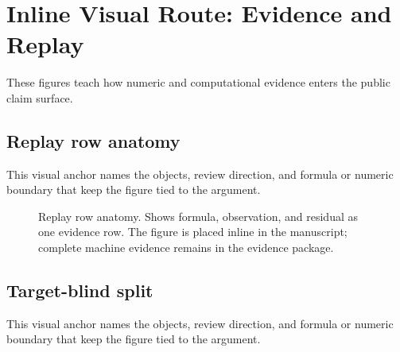 \section{Inline Visual Route: Evidence and Replay}

These figures teach how numeric and computational evidence enters the public claim surface.


\subsection{Replay row anatomy}

This visual anchor names the objects, review direction, and formula or numeric boundary that keep the figure tied to the argument.


\begin{figure}[htbp]

\centering


\caption{Replay row anatomy. Shows formula, observation, and residual as one evidence row. The figure is placed inline in the manuscript; complete machine evidence remains in the evidence package.}

\label{fig:r005-inline-28c_oc133_inline_figures_evidence_route-1}

\end{figure}

\subsection{Target-blind split}

This visual anchor names the objects, review direction, and formula or numeric boundary that keep the figure tied to the argument.


